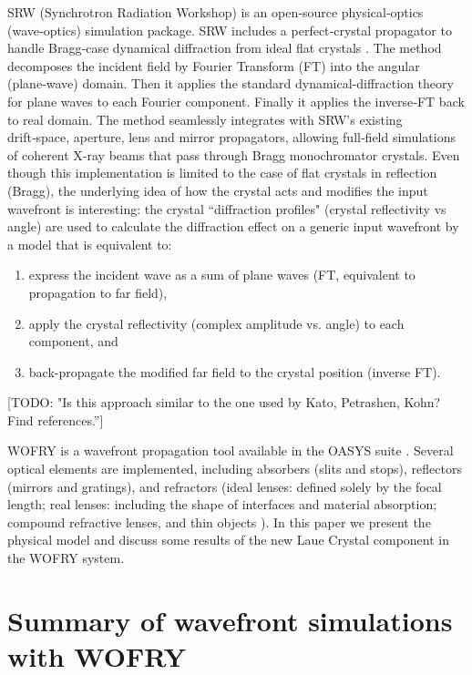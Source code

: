 \documentclass[preprint]{iucr}              %
\newcommand{\todo}[1]{{\color{red}[TODO: "#1'']}}
\newcommand{\inred}[1]{{\color{red}#1}}
\begin{document}
SRW (Synchrotron Radiation Workshop) \cite{codeSRW} is an open‑source physical‑optics (wave‑optics) simulation package.
SRW includes a perfect‑crystal propagator to handle Bragg‑case dynamical diffraction from ideal flat crystals \cite{codeSRWcrystals}.
The method decomposes the incident field by Fourier Transform (FT) into the angular (plane‑wave) domain. Then it applies the standard dynamical‑diffraction theory for plane waves \cite{ZachariasenBook} to each Fourier component. 
Finally it applies the inverse‑FT back to real domain. 
The method \inred{seamlessly} integrates with SRW’s existing drift‑space, aperture, lens and mirror propagators, allowing full‑field simulations of coherent X‑ray beams that pass through Bragg monochromator crystals.
Even though this implementation is limited to the case of flat crystals in reflection (Bragg), the underlying idea of how the crystal acts and modifies the input wavefront is interesting: the crystal ``diffraction profiles" (crystal reflectivity vs angle) are used to calculate the diffraction effect on a generic input wavefront by a model that is equivalent to: 
\begin{enumerate}
    \item express the incident wave as a sum of plane waves (FT, equivalent to propagation to far field),
    \item apply the crystal reflectivity (complex amplitude vs. angle) to each component, and
    \item back-propagate the modified far field to the crystal position (inverse FT).
\end{enumerate}
\todo{Is this approach similar to the one used by Kato, Petrashen, Kohn? Find references.}


WOFRY \cite{WOFRYoptics} is a wavefront propagation tool available in the OASYS suite \cite{OASYS}. 
Several optical elements are implemented, including absorbers (slits and stops), reflectors (mirrors and gratings), and refractors (ideal lenses: defined solely by the focal length; real lenses: including the shape of interfaces and material absorption; compound refractive lenses, and thin objects \cite{Celestre2019}).
In this paper we present the physical model and discuss some results of the new Laue Crystal component in the WOFRY system.

\section{Summary of wavefront simulations with WOFRY}
\end{document}
